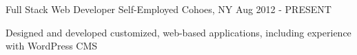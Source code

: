 \begin{cventries}
  \cventry
    {Full Stack Web Developer} %
    {Self-Employed} %
    {Cohoes, NY} %
    {Aug 2012 - PRESENT} %
    {
      \begin{cvitems} %
        \item {Designed and developed customized, web-based applications, including experience with WordPress CMS}
      \end{cvitems}
    }

\end{cventries}
